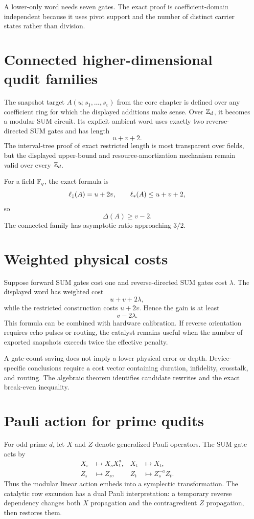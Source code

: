 A lower-only word needs seven gates.  The exact proof is coefficient-domain independent because it uses pivot support and the number of distinct carrier states rather than division.

\section{Connected higher-dimensional qudit families}
The snapshot target $A(u;s_1,\ldots,s_v)$ from the core chapter is defined over any coefficient ring for which the displayed additions make sense.  Over $\mathbb Z_d$, it becomes a modular SUM circuit.  Its explicit ambient word uses exactly two reverse-directed SUM gates and has length
\[
u+v+2.
\]
The interval-tree proof of exact restricted length is most transparent over fields, but the displayed upper-bound and resource-amortization mechanism remain valid over every $\mathbb Z_d$.

For a field $\mathbb F_q$, the exact formula is
\[
\ell_{\downarrow}(A)=u+2v,
\qquad
\ell_{*}(A)\le u+v+2,
\]
so
\[
\Delta(A)\ge v-2.
\]
The connected family has asymptotic ratio approaching $3/2$.

\section{Weighted physical costs}
Suppose forward SUM gates cost one and reverse-directed SUM gates cost $\lambda$.  The displayed word has weighted cost
\[
u+v+2\lambda,
\]
while the restricted construction costs $u+2v$.  Hence the gain is at least
\[
v-2\lambda.
\]
This formula can be combined with hardware calibration.  If reverse orientation requires echo pulses or routing, the catalyst remains useful when the number of exported snapshots exceeds twice the effective penalty.

\begin{boundarybox}
A gate-count saving does not imply a lower physical error or depth.  Device-specific conclusions require a cost vector containing duration, infidelity, crosstalk, and routing.  The algebraic theorem identifies candidate rewrites and the exact break-even inequality.
\end{boundarybox}

\section{Pauli action for prime qudits}
For odd prime $d$, let $X$ and $Z$ denote generalized Pauli operators.  The SUM gate acts by
\begin{align*}
X_s&\mapsto X_sX_t^a,
&
X_t&\mapsto X_t,\\
Z_s&\mapsto Z_s,
&
Z_t&\mapsto Z_s^{-a}Z_t.
\end{align*}
Thus the modular linear action embeds into a symplectic transformation.  The catalytic row excursion has a dual Pauli interpretation: a temporary reverse dependency changes both $X$ propagation and the contragredient $Z$ propagation, then restores them.

